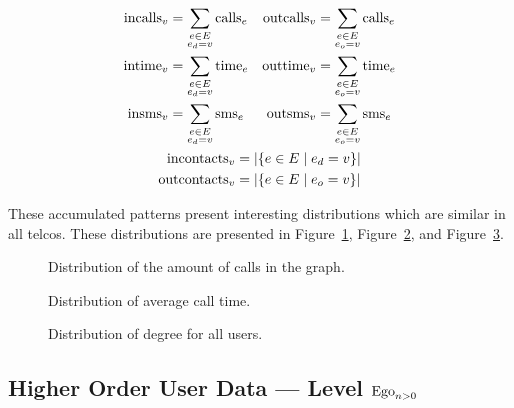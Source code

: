 \begin{equation}
\begin{gathered}
\begin{aligned}
\operatorname{incalls}_v &= \sum_{\substack{e \in E \\ e_d = v}} \operatorname{calls}_e &
\operatorname{outcalls}_v &= \sum_{\substack{e \in E \\ e_o = v}} \operatorname{calls}_e \\
\operatorname{intime}_v &= \sum_{\substack{e \in E \\ e_d = v}} \operatorname{time}_e &
\operatorname{outtime}_v &= \sum_{\substack{e \in E \\ e_o = v}} \operatorname{time}_e \\
\operatorname{insms}_v &= \sum_{\substack{e \in E \\ e_d = v}} \operatorname{sms}_e &
\operatorname{outsms}_v &= \sum_{\substack{e \in E \\ e_o = v}} \operatorname{sms}_e \\
\end{aligned} \\
\begin{aligned}
\operatorname{incontacts}_v &= \left| \left\{ e \in E \mid e_d = v \right\} \right| \\
\operatorname{outcontacts}_v &= \left| \left\{ e \in E \mid e_o = v \right\} \right|
\end{aligned}
\end{gathered}
\label{eq:user_data}
\end{equation}

These accumulated patterns present interesting distributions which are similar in all telcos. These distributions are presented in Figure~\ref{fig:callsms}, Figure~\ref{fig:time}, and Figure~\ref{fig:contacts}.

\begin{figure}
\caption{Distribution of the amount of calls in the graph.}
\label{fig:callsms}
\end{figure}

\begin{figure}
\caption{Distribution of average call time.}
\label{fig:time}
\end{figure}

\begin{figure}
\caption{Distribution of degree for all users.}
\label{fig:contacts}
\end{figure}

\subsection{Higher Order User Data --- Level $\operatorname{Ego}_{n > 0}$}
\label{subsec:higherorderuserdata}

